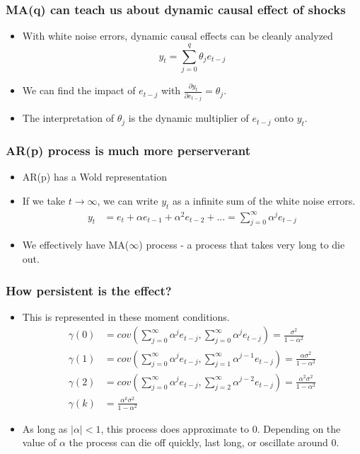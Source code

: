 \documentclass[aspectratio=169]{beamer}
\begin{document}
\begin{frame}
\frametitle{MA(q) can teach us about dynamic causal effect of shocks}
\begin{itemize}
\item With white noise errors, dynamic causal effects can be cleanly analyzed
\[
y_t = \sum_{j=0}^q \theta_j e_{t-j}
\]
\item We can find the impact of $e_{t-j}$ with $\frac{\partial y_t}{\partial e_{t-j}}=\theta_j$.
\item  The interpretation of $\theta_j$ is the dynamic multiplier of $e_{t-j}$ onto $y_t$. 
\end{itemize}
\end{frame}

\begin{frame}
\frametitle{AR(p) process is much more perserverant}
\begin{itemize}
\item AR(p) has a Wold representation
\item If we take $t\to\infty$, we can write $y_t$ as a infinite sum of the white noise errors.
\[
\begin{aligned}
y_t &= e_t + \alpha e_{t-1} + \alpha^2 e_{t-2} + ...=\sum_{j=0}^\infty \alpha^je_{t-j}
\end{aligned}
\]
\item We effectively have MA($\infty$) process - a process that takes very long to die out.
\end{itemize}
\end{frame}

\begin{frame}
\frametitle{How persistent is the effect?}
\begin{itemize}
\item This is represented in these moment conditions.
\[
\begin{aligned}
\gamma(0)&=cov\left(\sum_{j=0}^\infty \alpha^j e_{t-j},\sum_{j=0}^\infty \alpha^j e_{t-j}\right)=\frac{\sigma^2}{1-\alpha^2}\\
\gamma(1)&=cov\left(\sum_{j=0}^\infty \alpha^j e_{t-j},\sum_{j=1}^\infty \alpha^{j-1} e_{t-j}\right)=\frac{\alpha\sigma^2}{1-\alpha^2}\\
\gamma(2)&=cov\left(\sum_{j=0}^\infty \alpha^j e_{t-j},\sum_{j=2}^\infty \alpha^{j-2} e_{t-j}\right)=\frac{\alpha^2\sigma^2}{1-\alpha^2}\\
\gamma(k)&=\frac{\alpha^k\sigma^2}{1-\alpha^2}
\end{aligned}
\]
\item As long as $|\alpha|<1$, this process does approximate to 0. Depending on the value of $\alpha$ the process can die off quickly, last long, or oscillate around 0. 
\end{itemize}
\end{frame}
\end{document}
